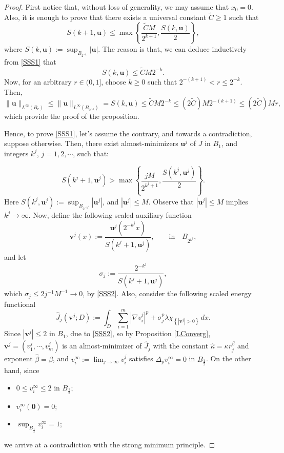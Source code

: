 \documentclass{amsart}
\begin{document}
\begin{proof}
First notice that, without loss of generality, we may assume that $x_0 = 0$. Also, it is enough to prove that there exists a universal constant $\tilde C\ge 1$ such that
\begin{equation}
\label{SSS1}
S(k+1, \mathbf{u}) \leq \max \left\{ \frac{\tilde CM}{2^{k+1}}, \frac{S(k,\mathbf{u})}{2} \right\},
\end{equation}
where $ S(k,\mathbf{u}) := \sup_{B_{2^{-k}}} |\mathbf{u}|$. 
The reason is that, we can deduce inductively from \eqref{SSS1} that
$$ S(k,\mathbf{u}) \leq  \tilde CM 2^{-k}. $$
Now,  for an arbitrary $r \in (0,1]$, choose $k \geq 0$ such that $2^{-(k+1)}< r \le 2^{-k}$. Then,
$$
\|\mathbf{u}\|_{L^\infty(B_{r})} \leq \|\mathbf{u}\|_{L^\infty \left(B_{2^{-k}} \right)} = S(k,\mathbf{u}) \leq \tilde{C}M 2^{-k} \leq \left(2 \tilde{C} \right)M 2^{-(k+1)} \leq \left(2 \tilde{C} \right)M r,
$$
which provide the proof of the proposition. 


 Hence, to prove \eqref{SSS1}, let's assume the contrary, and towards a contradiction, suppose otherwise. Then, there exist almost-minimizers $\mathbf{u}^j$ of $J$ in $B_1$, and integers $k^j$, $j=1,2, \cdots$, such that:


\begin{equation}
\label{SSS2}
S \left(k^j+1,\mathbf{u}^j \right) > \max \left\{ \frac{jM}{2^{k^j+1}}, \frac{S \left(k^j,\mathbf{u}^j \right)}{2} \right\}.
\end{equation} 
Here $ S \left(k^j,\mathbf{u}^j \right) :=\sup_{B_{2^{-k^j}}} \left|\mathbf{u}^j \right|$, and $ \left|\mathbf{u}^j \right|  \leq M$.
Observe that $ \left|\mathbf{u}^j \right| \leq M$ implies $k^j \to \infty$. 
Now, define the following scaled auxiliary function
$$ \mathbf{v}^j(x) := \frac{\mathbf{u}^j \left(2^{-k^j}x \right)}{S \left(k^j+1,\mathbf{u}^j \right)}, \qquad \text{in} \quad B_{2^{k^j}},$$
and let
$$ \sigma_j := \frac{2^{-k^j}}{S\left(k^j+1,\mathbf{u}^j\right)}, $$
which $\sigma_j \leq 2j^{-1}M^{-1} \to 0$, by \eqref{SSS2}. 
Also, consider the following scaled energy functional
$$
\hat{J}_j \left(\mathbf{v}^j; D \right):=\int_{D} \sum_{i=1}^{m} \left|\nabla v_i^j \right|^p + \sigma_j^p \lambda \chi_{\left\{\left|\mathbf{v}^j \right|>0 \right\}} \, dx.
$$
Since $\left|\mathbf{v}^j \right|\leq 2$ in $B_{1}$, due to \eqref{SSS2}, 
so by Proposition \ref{LConverg}, $\mathbf{v}^j=\left(v_1^j, \cdots, v_m^j \right)$ is an almost-minimizer of $\hat{J}_j$ with the constant $\hat{\kappa}=\kappa r_j^{\beta}$ and exponent $\hat{\beta}=\beta$, and $v_i^{\infty}:=\lim_{j \to \infty} v_i^j$ satisfies $\Delta_p v_i^{\infty} = 0 $ in $B_{\frac12}$. On the other hand, since 
\begin{itemize}
\item
$0 \leq v_i^{\infty} \leq 2$ in $B_{\frac12}$; 
\item
$v_i^{\infty}(\mathbf{0})=0$;
\item
$\sup_{B_{\frac{1}{2}}} v_i^{\infty} =1$; 
\end{itemize}
we arrive at   a contradiction with the strong minimum principle. 
\end{proof}
\end{document}
